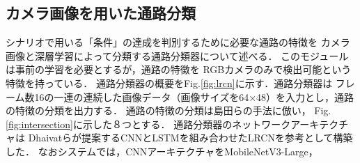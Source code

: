 \documentclass{sice-si}
\begin{document}

\subsection{カメラ画像を用いた通路分類}
シナリオで用いる「条件」の達成を判別するために必要な通路の特徴を
カメラ画像と深層学習によって分類する通路分類器について述べる．
このモジュールは事前の学習を必要とするが，通路の特徴を
RGBカメラのみで検出可能という特徴を持っている．
通路分類器の概要をFig.\ref{fig:lrcn}に示す．通路分類器は
フレーム数16の一連の連続した画像データ（画像サイズを64×48）を入力とし，通路の特徴の分類を出力する．
通路の特徴の分類は島田らの手法\cite{shimada2020}に倣い，
Fig.\ref{fig:intersection}に示した８つとする．
通路分類器のネットワークアーキテクチャは
Dhaivatらが提案するCNNとLSTMを組み合わせたLRCN\cite{lrcn}を参考として構築した．
なおシステムでは，CNNアーキテクチャをMobileNetV3-Large\cite{v3}，
\end{document}
